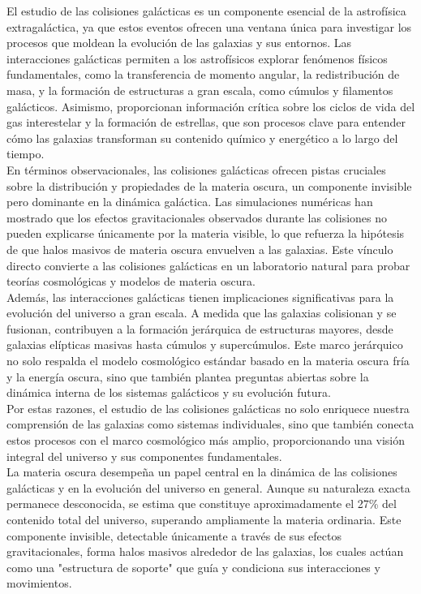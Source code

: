 \documentclass{article}
\begin{document}
El estudio de las colisiones galácticas es un componente esencial de la astrofísica extragaláctica, ya que estos eventos ofrecen una ventana única para investigar los procesos que moldean la evolución de las galaxias y sus entornos. Las interacciones galácticas permiten a los astrofísicos explorar fenómenos físicos fundamentales, como la transferencia de momento angular, la redistribución de masa, y la formación de estructuras a gran escala, como cúmulos y filamentos galácticos. Asimismo, proporcionan información crítica sobre los ciclos de vida del gas interestelar y la formación de estrellas, que son procesos clave para entender cómo las galaxias transforman su contenido químico y energético a lo largo del tiempo. \\

En términos observacionales, las colisiones galácticas ofrecen pistas cruciales sobre la distribución y propiedades de la materia oscura, un componente invisible pero dominante en la dinámica galáctica. Las simulaciones numéricas han mostrado que los efectos gravitacionales observados durante las colisiones no pueden explicarse únicamente por la materia visible, lo que refuerza la hipótesis de que halos masivos de materia oscura envuelven a las galaxias. Este vínculo directo convierte a las colisiones galácticas en un laboratorio natural para probar teorías cosmológicas y modelos de materia oscura. \\

Además, las interacciones galácticas tienen implicaciones significativas para la evolución del universo a gran escala. A medida que las galaxias colisionan y se fusionan, contribuyen a la formación jerárquica de estructuras mayores, desde galaxias elípticas masivas hasta cúmulos y supercúmulos. Este marco jerárquico no solo respalda el modelo cosmológico estándar basado en la materia oscura fría y la energía oscura, sino que también plantea preguntas abiertas sobre la dinámica interna de los sistemas galácticos y su evolución futura. \\

Por estas razones, el estudio de las colisiones galácticas no solo enriquece nuestra comprensión de las galaxias como sistemas individuales, sino que también conecta estos procesos con el marco cosmológico más amplio, proporcionando una visión integral del universo y sus componentes fundamentales. \\

La materia oscura desempeña un papel central en la dinámica de las colisiones galácticas y en la evolución del universo en general. Aunque su naturaleza exacta permanece desconocida, se estima que constituye aproximadamente el 27\% del contenido total del universo, superando ampliamente la materia ordinaria. Este componente invisible, detectable únicamente a través de sus efectos gravitacionales, forma halos masivos alrededor de las galaxias, los cuales actúan como una "estructura de soporte" que guía y condiciona sus interacciones y movimientos. \\
\end{document}
